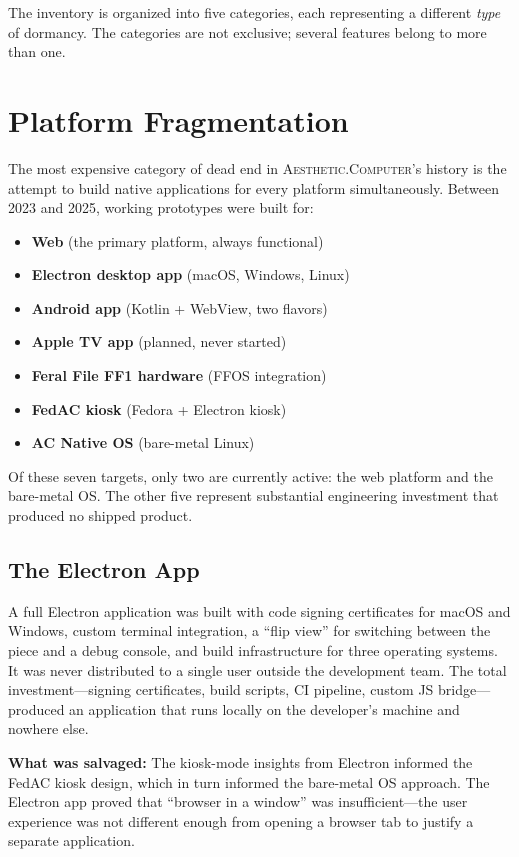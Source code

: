 \documentclass[10pt,letterpaper,twocolumn]{article}
\newcommand{\ac}{\textsc{Aesthetic.Computer}}
\begin{document}
The inventory is organized into five categories, each representing a different \emph{type} of dormancy. The categories are not exclusive; several features belong to more than one.

\section{Platform Fragmentation}
\label{sec:fragmentation}

The most expensive category of dead end in \ac{}'s history is the attempt to build native applications for every platform simultaneously. Between 2023 and 2025, working prototypes were built for:

\begin{itemize}
  \item \textbf{Web} (the primary platform, always functional)
  \item \textbf{Electron desktop app} (macOS, Windows, Linux)
  \item \textbf{Android app} (Kotlin + WebView, two flavors)
  \item \textbf{Apple TV app} (planned, never started)
  \item \textbf{Feral File FF1 hardware} (FFOS integration)
  \item \textbf{FedAC kiosk} (Fedora + Electron kiosk)
  \item \textbf{AC Native OS} (bare-metal Linux)
\end{itemize}

Of these seven targets, only two are currently active: the web platform and the bare-metal OS. The other five represent substantial engineering investment that produced no shipped product.

\subsection{The Electron App}

A full Electron application was built with code signing certificates for macOS and Windows, custom terminal integration, a ``flip view'' for switching between the piece and a debug console, and build infrastructure for three operating systems. It was never distributed to a single user outside the development team. The total investment---signing certificates, build scripts, CI pipeline, custom JS bridge---produced an application that runs locally on the developer's machine and nowhere else.

\textbf{What was salvaged:} The kiosk-mode insights from Electron informed the FedAC kiosk design, which in turn informed the bare-metal OS approach. The Electron app proved that ``browser in a window'' was insufficient---the user experience was not different enough from opening a browser tab to justify a separate application.
\end{document}
